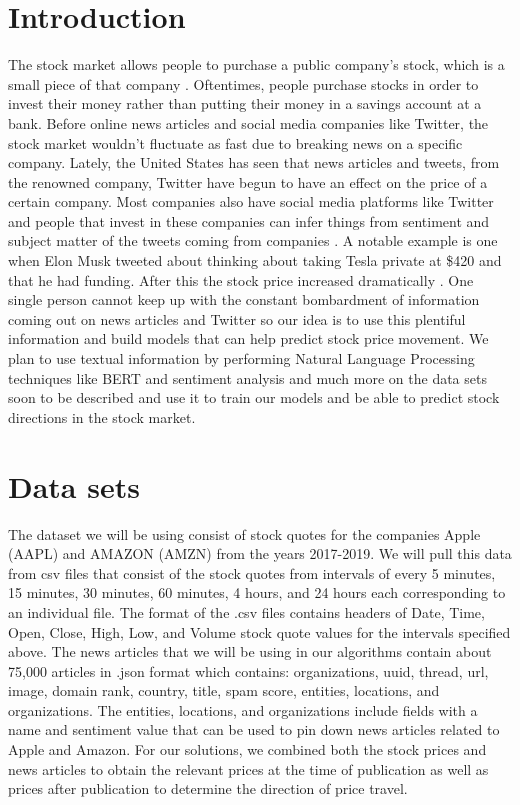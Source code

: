 \documentclass[conference]{IEEEtran}
\begin{document}
\section{Introduction}
The stock market allows people to purchase a public company’s stock, which is a small piece of that company \cite{b2}. Oftentimes, people purchase stocks in order to invest their money rather than putting their money in a savings account at a bank. Before online news articles and social media companies like Twitter, the stock market wouldn’t fluctuate as fast due to breaking news on a specific company. Lately, the United States has seen that news articles and tweets, from the renowned company, Twitter have begun to have an effect on the price of a certain company. Most companies also have social media platforms like Twitter and people that invest in these companies can infer things from sentiment and subject matter of the tweets coming from companies \cite{b6}. A notable example is one when Elon Musk tweeted about thinking about taking Tesla private at \$420 and that he had funding. After this the stock price increased dramatically \cite{b4}. One single person cannot keep up with the constant bombardment of information coming out on news articles and Twitter so our idea is to use this plentiful information and build models that can help predict stock price movement. We plan to use textual information by performing Natural Language Processing techniques like BERT and sentiment analysis and much more on the data sets soon to be described and use it to train our models and be able to predict stock directions in the stock market.

\section{Data sets}
The dataset we will be using consist of stock quotes for the companies Apple (AAPL) and AMAZON (AMZN) from the years 2017-2019. We will pull this data from csv files that consist of the stock quotes from intervals of every 5 minutes, 15 minutes, 30 minutes, 60 minutes, 4 hours, and 24 hours each corresponding to an individual file. The format of the .csv files contains headers of Date, Time, Open, Close, High, Low, and Volume stock quote values for the intervals specified above. The news articles that we will be using in our algorithms contain about 75,000 articles in .json format which contains: organizations, uuid, thread, url, image, domain rank, country, title, spam score, entities, locations, and organizations. The entities, locations, and organizations include fields with a name and sentiment value that can be used to pin down news articles related to Apple and Amazon.
For our solutions, we combined both the stock prices and news articles to obtain the relevant prices at the time of publication as well as prices after publication to determine the direction of price travel.
\end{document}
